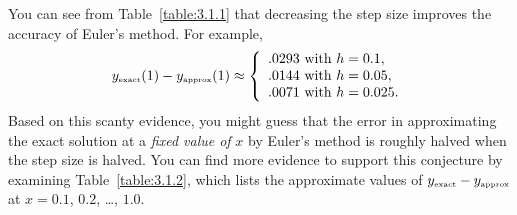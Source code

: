 \begin{examplesolution}
You can see from Table~\ref{table:3.1.1} that decreasing the step size improves the accuracy of
Euler's method. For example,
\[
  y_{\mbox{\tiny exact}}(1)-y_{\mbox{\tiny approx}}(1)\approx \left\{
  \begin{array}{l}
    .0293\mbox{ with }h=0.1,   \\
    .0144\mbox{ with }h=0.05,  \\
    .0071\mbox{ with }h=0.025.
  \end{array}\right.
\]
Based on this scanty evidence, you might guess that the error in approximating the exact solution at
a {\relax\it fixed value of\/} $x$ by Euler's method is roughly halved when the step size is
halved. You can find more evidence to support this conjecture by examining Table~\ref{table:3.1.2},
which lists the approximate values of $y_{\mbox{\tiny exact}}-y_{\mbox{\tiny approx}}$ at $x=0.1$,
$0.2$, \dots, $1.0$.


\end{examplesolution}
